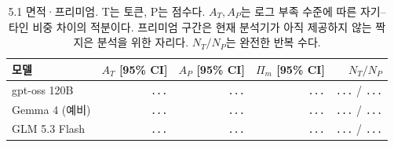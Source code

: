 \begin{table}[H]
\centering\footnotesize
\setlength{\tabcolsep}{4pt}
\caption{5.1 면적·프리미엄. T는 토큰, P는 점수다. $A_T,A_P$는 로그 부족 수준에 따른 자기--타인 비중 차이의 적분이다. 프리미엄 구간은 현재 분석기가 아직 제공하지 않는 짝지은 분석을 위한 자리다. $N_T/N_P$는 완전한 반복 수다.}
\label{tab:e51-results}
\begin{tabular}{@{}lrrrr@{}}
\toprule
모델 & $A_T$ [95\% CI] & $A_P$ [95\% CI] & $\Pi_m$ [95\% CI] & $N_T/N_P$ \\
\midrule
gpt-oss 120B & {\color{gray}\texttt{...}} & {\color{gray}\texttt{...}} & {\color{gray}\texttt{...}} & {\color{gray}\texttt{...}} / {\color{gray}\texttt{...}} \\
Gemma 4 (예비) & {\color{gray}\texttt{...}} & {\color{gray}\texttt{...}} & {\color{gray}\texttt{...}} & {\color{gray}\texttt{...}} / {\color{gray}\texttt{...}} \\
GLM 5.3 Flash & {\color{gray}\texttt{...}} & {\color{gray}\texttt{...}} & {\color{gray}\texttt{...}} & {\color{gray}\texttt{...}} / {\color{gray}\texttt{...}} \\
\bottomrule
\end{tabular}
\end{table}
